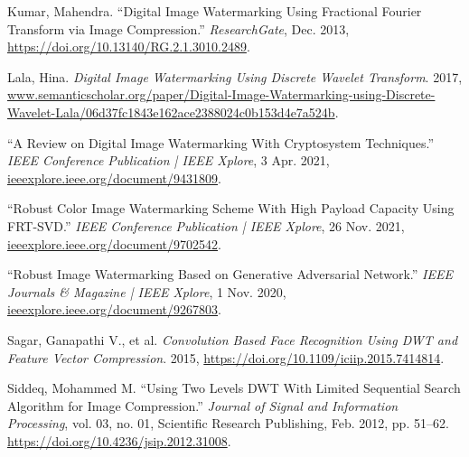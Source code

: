 \documentclass[conference]{IEEEtran}
\begin{document}
\begin{thebibliography}{00}
 Kumar, Mahendra. “Digital Image Watermarking Using Fractional Fourier Transform via Image Compression.” \textit{ResearchGate}, Dec. 2013, \url{https://doi.org/10.13140/RG.2.1.3010.2489}.

 Lala, Hina. \textit{Digital Image Watermarking Using Discrete Wavelet Transform}. 2017, \url{www.semanticscholar.org/paper/Digital-Image-Watermarking-using-Discrete-Wavelet-Lala/06d37fc1843e162ace2388024c0b153d4e7a524b}.

 “A Review on Digital Image Watermarking With Cryptosystem Techniques.” \textit{IEEE Conference Publication | IEEE Xplore}, 3 Apr. 2021, \url{ieeexplore.ieee.org/document/9431809}.

 “Robust Color Image Watermarking Scheme With High Payload Capacity Using FRT-SVD.” \textit{IEEE Conference Publication | IEEE Xplore}, 26 Nov. 2021, \url{ieeexplore.ieee.org/document/9702542}.

 “Robust Image Watermarking Based on Generative Adversarial Network.” \textit{IEEE Journals & Magazine | IEEE Xplore}, 1 Nov. 2020, \url{ieeexplore.ieee.org/document/9267803}.

 Sagar, Ganapathi V., et al. \textit{Convolution Based Face Recognition Using DWT and Feature Vector Compression}. 2015, \url{https://doi.org/10.1109/iciip.2015.7414814}.

 Siddeq, Mohammed M. “Using Two Levels DWT With Limited Sequential Search Algorithm for Image Compression.” \textit{Journal of Signal and Information Processing}, vol. 03, no. 01, Scientific Research Publishing, Feb. 2012, pp. 51–62. \url{https://doi.org/10.4236/jsip.2012.31008}.


\end{thebibliography}
\end{document}

